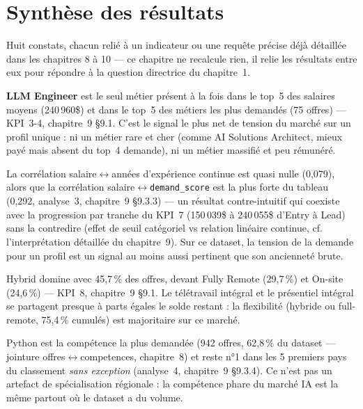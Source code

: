 \chapter{Synthèse des résultats}

Huit constats, chacun relié à un indicateur ou une requête précise déjà
détaillée dans les chapitres 8 à 10 — ce chapitre ne recalcule rien, il
relie les résultats entre eux pour répondre à la question directrice
du chapitre~1.

\begin{constat}
\textbf{LLM Engineer} est le seul métier présent à la fois dans le
top~5 des salaires moyens (240\,960\$) et dans le top~5 des métiers les
plus demandés (75 offres) — KPI~3-4, chapitre~9 §9.1. C'est le signal
le plus net de tension du marché sur un profil unique : ni un métier
rare et cher (comme AI Solutions Architect, mieux payé mais absent du
top~4 demande), ni un métier massifié et peu rémunéré.
\end{constat}

\begin{constat}
La corrélation salaire$\leftrightarrow$années d'expérience continue est
quasi nulle (0,079), alors que la corrélation
salaire$\leftrightarrow$\texttt{demand\_score} est la plus forte du
tableau (0,292, analyse~3, chapitre~9 §9.3.3) — un résultat
contre-intuitif qui coexiste avec la progression par tranche du KPI~7
(150\,039\$ à 240\,055\$ d'Entry à Lead) sans la contredire (effet de
seuil catégoriel vs relation linéaire continue, cf. l'interprétation
détaillée du chapitre~9). Sur ce dataset, la tension de la demande pour
un profil est un signal au moins aussi pertinent que son ancienneté
brute.
\end{constat}

\begin{constat}
Hybrid domine avec 45,7\,\% des offres, devant Fully Remote (29,7\,\%)
et On-site (24,6\,\%) — KPI~8, chapitre~9 §9.1. Le télétravail intégral
et le présentiel intégral se partagent presque à parts égales le solde
restant : la flexibilité (hybride ou full-remote, 75,4\,\% cumulés) est
majoritaire sur ce marché.
\end{constat}

\begin{constat}
Python est la compétence la plus demandée (942 offres, 62,8\,\% du
dataset — jointure offres$\leftrightarrow$competences, chapitre~8) et
reste n°1 dans les 5 premiers pays du classement \emph{sans exception}
(analyse~4, chapitre~9 §9.3.4). Ce n'est pas un artefact de
spécialisation régionale : la compétence phare du marché IA est la
même partout où le dataset a du volume.
\end{constat}

